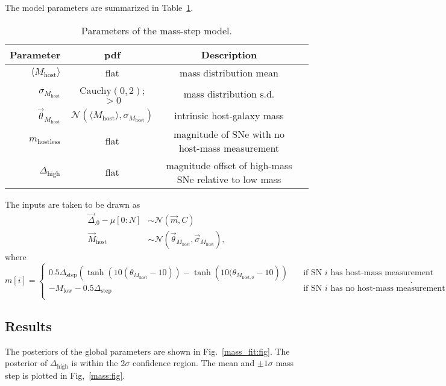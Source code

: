 \documentclass{aastex61}   	%
\begin{document}
The model parameters are summarized in Table~\ref{mass:tab}.

\begin{table}
\begin{center}
\caption{Parameters of the mass-step model.\label{mass:tab}}
\begin{tabular}{rccc}
\hline
Parameter & pdf & Description\\ \hline
$\langle M_{\text{host}} \rangle$ &flat& mass distribution mean \\
$\sigma_{M_{\text{host}}}$ &$\text{Cauchy}(0,2)$; $>0$& mass distribution s.d. \\
$\vec{\theta}_{M_{\text{host}}}$ &$\mathcal{N}(\langle M_{\text{host}} \rangle,\sigma_{M_{\text{host}}})$ &intrinsic host-galaxy mass\\
$m_{\mathrm{hostless}}$ & flat & magnitude of SNe with no host-mass measurement\\
$\Delta_{\mathrm{high}}$ & flat & magnitude offset of high-mass SNe relative to low mass\\
\hline
\end{tabular}
\end{center}
\end{table}


The inputs are taken to be drawn as
\begin{align}
\vec{\Delta}_{.0} - \mu[0:N] &  \sim \mathcal{N}(\vec{m},C) \\
\vec{M}_{\text{host}} & \sim \mathcal{N}(\vec{\theta}_{M_{\text{host}}},\vec{\sigma}_{M_{\text{host}}}),
\end{align}
where
\begin{equation}
m[i]=\begin{cases}
0.5\Delta_{\mathrm{step}}
\left(
\tanh{\left(10(\theta_{M_{\text{host}}}-10)\right)} -
\tanh{\left(10(\theta_{M_{\mathrm{host},0}}-10\right)}
\right)
& \quad \text{if SN }i\text{ has host-mass measurement} \\
-M_{\mathrm{low}} - 0.5\Delta_{\mathrm{step}}& \quad \text{if SN }i\text{ has no host-mass measurement}  \\
\end{cases}.
\end{equation}

\subsection{Results}

The posteriors of the global parameters are shown in Fig.~\ref{mass_fit:fig}.  The posterior of $\Delta_{\text{high}}$
is within the 2$\sigma$ confidence region.  
The mean and $\pm1\sigma$ mass step is plotted in Fig,~\ref{mass:fig}.
\end{document}
